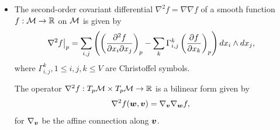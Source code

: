 \documentclass[11pt]{article}
\begin{document}
\begin{itemize}
\item The second-order covariant differential $\nabla^{2}f = \nabla \nabla f$ of a smooth function $f: {\mathcal M}\rightarrow {\mathbb R}$ on ${\mathcal M}$ is given by 
\begin{align*}
\left.{\nabla^{2}f}\right\vert_{p} &= \sum_{i,j}\left(\left(\frac{\partial ^{2}f}{ \partial x_{i}\partial x_{j}}\right)_{p} - \sum_{k}\Gamma_{i,j}^{k}\left(\frac{\partial f}{ \partial x_{k}}\right)_p\right)dx_{i}\wedge dx_{j},
\end{align*} where $\Gamma_{i,j}^{k}, 1 \le i,j,k \le V$ are Christoffel symbols.

The operator $\nabla^{2}f: T_{p}{\mathcal M} \times T_{p}{\mathcal M} \rightarrow {\mathbb R}$ is a bilinear form given by  
\begin{align*}
\nabla^{2}f(\boldsymbol{w}, \boldsymbol{v}) &= \nabla_{\boldsymbol{v}}\nabla_{\boldsymbol{w}}f,
\end{align*} for $\nabla_{\boldsymbol{v}}$ be the affine connection along $\boldsymbol{v}$.
\end{itemize}
\end{document}
